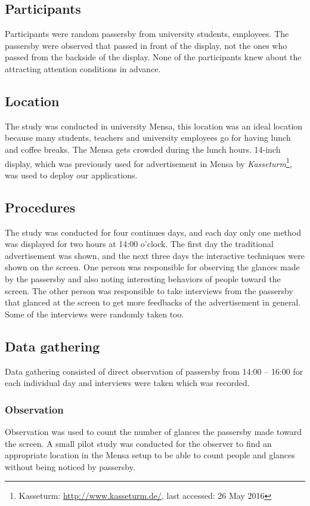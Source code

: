 \subsection{Participants}
Participants were random passersby from university students, employees. The passersby were observed that passed in front of the display, not the ones who passed from the backside of the display. None of the participants knew about the attracting attention conditions in advance.

\subsection{Location}
The study was conducted in university Mensa, this location was an ideal location because many students, teachers and university employees go for having lunch and coffee breaks. The Mensa gets crowded during the lunch hours. 14-inch display, which was previously used for advertisement in Mensa by \emph{Kasseturm}\footnote{Kasseturm: \url{http://www.kasseturm.de/}, last accessed: 26 May 2016}, was used to deploy our applications.


\subsection{Procedures}
The study was conducted for four continues days, and each day only one method was displayed for two hours at 14:00 o’clock. The first day the traditional advertisement was shown, and the next three days the interactive techniques were shown on the screen. One person was responsible for observing the glances made by the passersby and also noting interesting behaviors of people toward the screen. The other person was responsible to take interviews from the passersby that glanced at the screen to get more feedbacks of the advertisement in general. Some of the interviews were randomly taken too.

\subsection{Data gathering}
Data gathering consisted of direct observation of passersby from 14:00 – 16:00 for each individual day and interviews were taken which was recorded. 

\subsubsection{Observation}
Observation was used to count the number of glances the passersby made toward the screen. A small pilot study was conducted for the observer to find an appropriate location in the Mensa setup to be able to count people and glances without being noticed by passersby.



